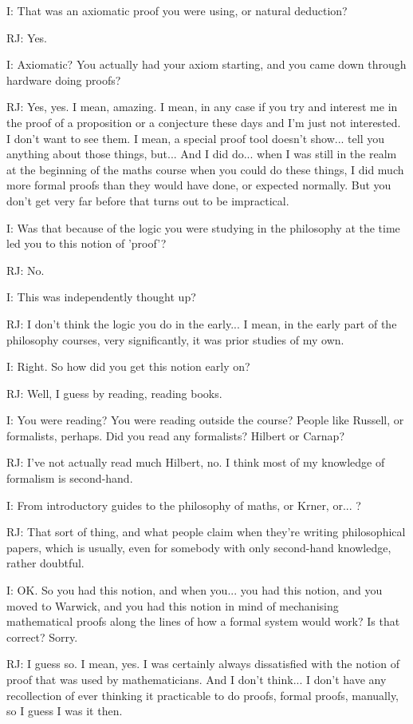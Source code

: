 \documentclass[10pt,titlepage]{book}
\begin{document}
I: That was an axiomatic proof you were using, or natural deduction?

RJ: Yes.

I: Axiomatic? You actually had your axiom starting, and you came down through hardware doing proofs?

RJ: Yes, yes. I mean, amazing. I mean, in any case if you try and interest me in the proof of a proposition or a conjecture these days and I'm just not interested. I don't want to see them. I mean, a special proof tool doesn't show... tell you anything about those things, but... And I did do... when I was still in the realm at the beginning of the maths course when you could do these things, I did much more formal proofs than they would have done, or expected normally. But you don't get very far before that turns out to be impractical.

I: Was that because of the logic you were studying in the philosophy at the time led you to this notion of 'proof'?

RJ: No.

I: This was independently thought up?

RJ: I don't think the logic you do in the early... I mean, in the early part of the philosophy courses, very significantly, it was prior studies of my own.

I: Right. So how did you get this notion early on?

RJ: Well, I guess by reading, reading books.

I: You were reading? You were reading outside the course? People like Russell, or formalists, perhaps. Did you read any formalists? Hilbert or Carnap?

RJ: I've not actually read much Hilbert, no. I think most of my knowledge of formalism is second-hand.

I: From introductory guides to the philosophy of maths, or Krner, or... ?

RJ: That sort of thing, and what people claim when they're writing philosophical papers, which is usually, even for somebody with only second-hand knowledge, rather doubtful.

I: OK. So you had this notion, and when you... you had this notion, and you moved to Warwick, and you had this notion in mind of mechanising mathematical proofs along the lines of how a formal system would work? Is that correct? Sorry.

RJ: I guess so. I mean, yes. I was certainly always dissatisfied with the notion of proof that was used by mathematicians. And I don't think... I don't have any recollection of ever thinking it practicable to do proofs, formal proofs, manually, so I guess I was 	it then.
\end{document}
